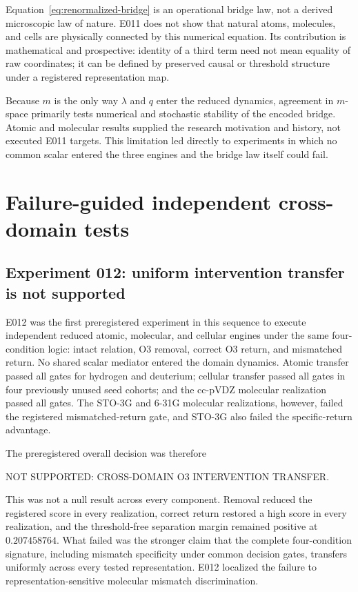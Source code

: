 \documentclass[11pt,a4paper]{article}
\newcommand{\statusnotsupported}{\textsf{NOT SUPPORTED}}
\begin{document}
Equation~\eqref{eq:renormalized-bridge} is an operational bridge law, not a derived microscopic law of nature. E011 does not show that natural atoms, molecules, and cells are physically connected by this numerical equation. Its contribution is mathematical and prospective: identity of a third term need not mean equality of raw coordinates; it can be defined by preserved causal or threshold structure under a registered representation map.

Because $m$ is the only way $\lambda$ and $q$ enter the reduced dynamics, agreement in $m$-space primarily tests numerical and stochastic stability of the encoded bridge. Atomic and molecular results supplied the research motivation and history, not executed E011 targets. This limitation led directly to experiments in which no common scalar entered the three engines and the bridge law itself could fail.

\section{Failure-guided independent cross-domain tests}

\subsection{Experiment 012: uniform intervention transfer is not supported}

E012 was the first preregistered experiment in this sequence to execute independent reduced atomic, molecular, and cellular engines under the same four-condition logic: intact relation, O3 removal, correct O3 return, and mismatched return. No shared scalar mediator entered the domain dynamics. Atomic transfer passed all gates for hydrogen and deuterium; cellular transfer passed all gates in four previously unused seed cohorts; and the cc-pVDZ molecular realization passed all gates. The STO-3G and 6-31G molecular realizations, however, failed the registered mismatched-return gate, and STO-3G also failed the specific-return advantage.

The preregistered overall decision was therefore
\begin{center}
\statusnotsupported: \textsf{CROSS-DOMAIN O3 INTERVENTION TRANSFER}.
\end{center}
This was not a null result across every component. Removal reduced the registered score in every realization, correct return restored a high score in every realization, and the threshold-free separation margin remained positive at $0.207458764$. What failed was the stronger claim that the complete four-condition signature, including mismatch specificity under common decision gates, transfers uniformly across every tested representation. E012 localized the failure to representation-sensitive molecular mismatch discrimination.
\end{document}
